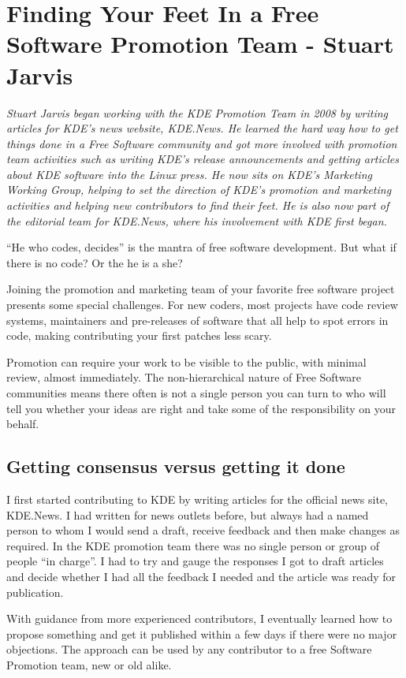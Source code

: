 \chapter{Finding Your Feet In a Free Software Promotion Team - Stuart Jarvis}

\textit{Stuart Jarvis began working with the KDE Promotion Team in 2008 by
writing articles for KDE's news website, KDE.News. He learned the hard way how
to get things done in a Free Software community and got more involved with
promotion team activities such as writing KDE's release announcements and
getting articles about KDE software into the Linux press. He now sits on KDE's
Marketing Working Group, helping to set the direction of KDE's promotion and
marketing activities and helping new contributors to find their feet. He is also
now part of the editorial team for KDE.News, where his involvement with KDE
first began.}

``He who codes, decides'' is the mantra of free software development. But what
if there is no code? Or the he is a she?

Joining the promotion and marketing team of your favorite free software project
presents some special challenges. For new coders, most projects have code review
systems, maintainers and pre-releases of software that all help to spot errors
in code, making contributing your first patches less scary. 

Promotion can require your work to be visible to the public, with minimal
review, almost immediately. The non-hierarchical nature of Free Software
communities means there often is not a single person you can turn to who will
tell you whether your ideas are right and take some of the responsibility on
your behalf.

\section*{Getting consensus versus getting it done}

I first started contributing to KDE by writing articles for the official news
site, KDE.News. I had written for news outlets before, but always had a named
person to whom I would send a draft, receive feedback and then make changes as
required. In the KDE promotion team there was no single person or group of
people ``in charge''. I had to try and gauge the responses I got to draft
articles and decide whether I had all the feedback I needed and the article was
ready for publication.

With guidance from more experienced contributors, I eventually learned how to
propose something and get it published within a few days if there were no major
objections. The approach can be used by any contributor to a free Software
Promotion team, new or old alike.

